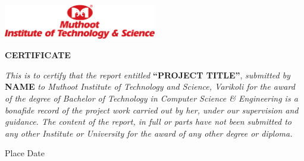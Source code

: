\begin{titlepage}

    \vspace{1.5cm}
    \begin{center}
        \includegraphics[width=0.50\textwidth]{images/MITS.png}\par\vspace{1cm}
        {\scshape \Large \bfseries CERTIFICATE \par}
    \end{center}

    \textit{This is to certify that the report entitled} \textbf{“PROJECT TITLE”}, \textit{submitted by} \textbf{NAME  } \textit{to Muthoot Institute of Technology and Science, Varikoli for the award of the degree of Bachelor of Technology in Computer Science \&  Engineering is a bonafide record of the project work carried out by her, under our supervision and guidance. The content of the report, in full or parts have not been submitted to any other Institute or University for the award of any other degree or diploma.}
    \vspace{2.5cm}
    \newline \noindent
    \newline

    \vspace{3cm}

    {\noindent Place \newline \noindent Date}

    \vspace{3cm}
    \noindent

\end{titlepage}